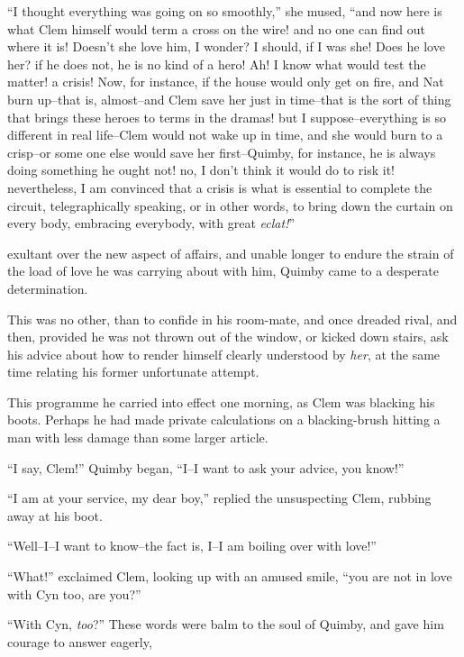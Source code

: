 ``I thought everything was going on so smoothly,'' she mused, ``and now
here is what Clem himself would term a cross on the wire! and no one can
find out where it is! Doesn't she love him, I wonder? I should, if I was
she! Does he love her? if he does not, he is no kind of a hero! Ah! I
know what would test the matter! a crisis! Now, for instance, if the
house would only get on fire, and Nat burn up--that is, almost--and Clem
save her just in time--that is the sort of thing that brings these
heroes to terms in the dramas! but I suppose--everything is so different
in real life--Clem would not wake up in time, and she would burn to a
crisp--or some one else would save her first--Quimby, for instance, he
is always doing something he ought not! no, I don't think it would do to
risk it! nevertheless, I am convinced that a crisis is what is essential
to complete the circuit, telegraphically speaking, or in other words, to
bring down the curtain on every body, embracing everybody, with great
\emph{eclat!}''








 exultant over the new aspect of affairs, and unable longer to
endure the strain of the load of love he was carrying about with him,
Quimby came to a desperate determination.

This was no other, than to confide in his room-mate, and once dreaded
rival, and then, provided he was not thrown out of the window, or kicked
down stairs, ask his advice about how to render himself clearly
understood by \emph{her}, at the same time relating his former unfortunate
attempt.

This programme he carried into effect one morning, as Clem was blacking
his boots. Perhaps he had made private calculations on a blacking-brush
hitting a man with less damage than some larger article.

``I say, Clem!'' Quimby began, ``I--I want to ask your advice, you know!''

``I am at your service, my dear boy,'' replied the unsuspecting Clem,
rubbing away at his boot.

``Well--I--I want to know--the fact is, I--I am boiling over with love!''

``What!'' exclaimed Clem, looking up with an amused smile, ``you are not in
love with Cyn too, are you?''

``With Cyn, \emph{too}?'' These words were balm to the soul of Quimby, and gave
him courage to answer eagerly,

